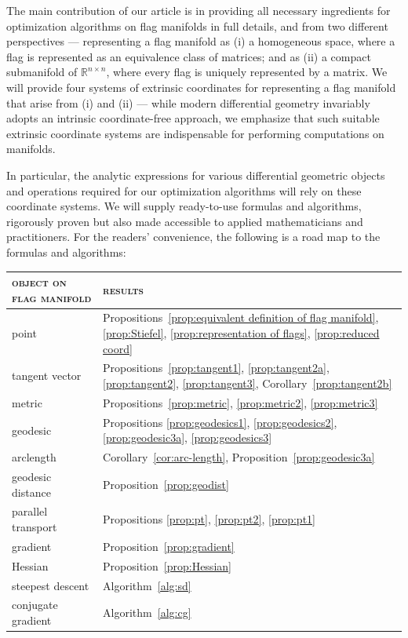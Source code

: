 \documentclass[11pt,reqno]{amsart}%
\theoremstyle{definition}
\theoremstyle{remark}
\begin{document}
The main contribution of  our article is in providing all necessary ingredients for optimization algorithms on flag manifolds in full details, and from two different perspectives --- representing a flag manifold as (i) a homogeneous space, where a flag is represented as an equivalence class of matrices; and as (ii) a compact submanifold of $\mathbb{R}^{n \times n}$, where every flag is uniquely represented by a matrix. We will provide four systems of extrinsic coordinates for representing a flag manifold that arise from (i) and (ii) --- while modern differential geometry invariably adopts an intrinsic coordinate-free approach, we emphasize that such suitable extrinsic coordinate systems are indispensable for performing computations on manifolds.

In particular, the analytic expressions for various differential geometric objects and operations required for our optimization algorithms will rely on these coordinate systems. We will supply ready-to-use formulas and algorithms, rigorously proven but also made accessible to applied mathematicians and practitioners. For the readers' convenience, the following is a road map to the formulas and algorithms:
\begin{center}
\footnotesize
\begin{tabular}{l|l}
\textsc{object on flag manifold} & \textsc{results}\\\hline\hline
point & Propositions~\ref{prop:equivalent definition of flag manifold}, \ref{prop:Stiefel}, \ref{prop:representation of flags}, \ref{prop:reduced coord}\\\hline
tangent vector & Propositions~\ref{prop:tangent1}, \ref{prop:tangent2a}, \ref{prop:tangent2}, \ref{prop:tangent3}, Corollary~\ref{prop:tangent2b}\\\hline
metric & Propositions~\ref{prop:metric}, \ref{prop:metric2}, \ref{prop:metric3} \\\hline
geodesic & Propositions \ref{prop:geodesics1},  \ref{prop:geodesics2}, \ref{prop:geodesic3a}, \ref{prop:geodesics3}\\\hline
arclength & Corollary~\ref{cor:arc-length}, Proposition~\ref{prop:geodesic3a}\\\hline
geodesic distance & Proposition~\ref{prop:geodist}\\\hline
parallel transport & Propositions \ref{prop:pt}, \ref{prop:pt2}, \ref{prop:pt1}\\\hline
gradient & Proposition~\ref{prop:gradient}\\\hline
Hessian & Proposition~\ref{prop:Hessian}\\\hline
steepest descent & Algorithm~\ref{alg:sd}\\\hline
conjugate gradient  & Algorithm~\ref{alg:cg}
\end{tabular}
\end{center}
\end{document}
